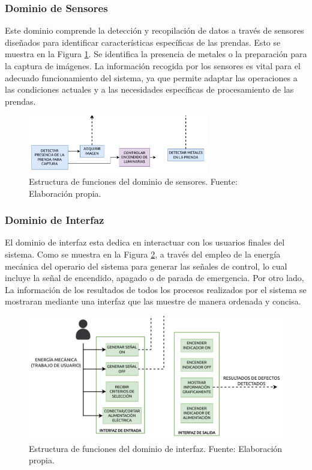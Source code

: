 \subsubsection{Dominio de Sensores}

Este dominio comprende la detección y recopilación de datos a través de sensores diseñados para identificar características específicas de las prendas. Esto se muestra en la Figura \ref{fig:EF_DS}. Se identifica la presencia de metales o la preparación para la captura de imágenes. La información recogida por los sensores es vital para el adecuado funcionamiento del sistema, ya que permite adaptar las operaciones a las condiciones actuales y a las necesidades específicas de procesamiento de las prendas.

\begin{figure}[h]
	\centering
	\includegraphics[width=0.7\textwidth]{img/EF_DS.pdf}
	\caption[Estructura de funciones del dominio de sensores.]{Estructura de funciones del dominio de sensores. Fuente: Elaboración propia.}
	\label{fig:EF_DS}
\end{figure}

\subsubsection{Dominio de Interfaz}

El dominio de interfaz esta dedica en interactuar con los usuarios finales del sistema. Como se muestra en la Figura \ref{fig:EF_DI}, a través del empleo de la energía mecánica del operario del sistema para generar las señales de control, lo cual incluye la señal de encendido, apagado o de parada de emergencia. Por otro lado, La información de los resultados de todos los procesos realizados por el sistema se mostraran mediante una interfaz que las muestre de manera ordenada y concisa.

\begin{figure}[h]
	\centering
	\includegraphics[width=\textwidth]{img/EF_DI.pdf}
	\caption[Estructura de funciones del dominio de interfaz.]{Estructura de funciones del dominio de interfaz. Fuente: Elaboración propia.}
	\label{fig:EF_DI}
\end{figure}

